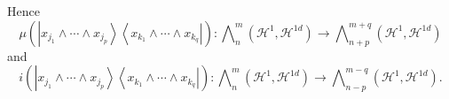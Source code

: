 \documentclass[aps,preprint]{revtex4}%
\begin{document}
Hence
\begin{equation}
\mu\left(  \left\vert x_{j_{1}}\wedge\cdots\wedge x_{j_{p}}\right\rangle
\left\langle x_{k_{1}}\wedge\cdots\wedge x_{k_{q}}\right\vert \right)  :%
{\textstyle\bigwedge\nolimits_{n}^{m}}
\left(  \mathcal{H}^{1},\mathcal{H}^{1d}\right)  \rightarrow%
{\textstyle\bigwedge\nolimits_{n+p}^{m+q}}
\left(  \mathcal{H}^{1},\mathcal{H}^{1d}\right)
\end{equation}
and%
\begin{equation}
i\left(  \left\vert x_{j_{1}}\wedge\cdots\wedge x_{j_{p}}\right\rangle
\left\langle x_{k_{1}}\wedge\cdots\wedge x_{k_{q}}\right\vert \right)  :%
{\textstyle\bigwedge\nolimits_{n}^{m}}
\left(  \mathcal{H}^{1},\mathcal{H}^{1d}\right)  \rightarrow%
{\textstyle\bigwedge\nolimits_{n-p}^{m-q}}
\left(  \mathcal{H}^{1},\mathcal{H}^{1d}\right)  .
\end{equation}
\end{document}
